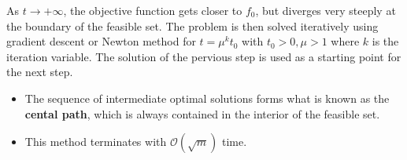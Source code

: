 As $t \to +\infty$, the objective function gets closer to $f_0$, but diverges very steeply at the boundary of the feasible set.
\newpar{}
The problem is then solved iteratively using gradient descent or Newton method for $t=\mu^k t_0$ with $t_0>0, \mu > 1$ where $k$ is the iteration variable. The solution of the pervious step is used as a starting point for the next step.


\newpar{}
\begin{itemize}
    \item The sequence of intermediate optimal solutions forms what is known as the \textbf{cental path}, which is always contained in the interior of the feasible set.
    \item This method terminates with $\mathcal{O}(\sqrt{m})$ time.
\end{itemize}

